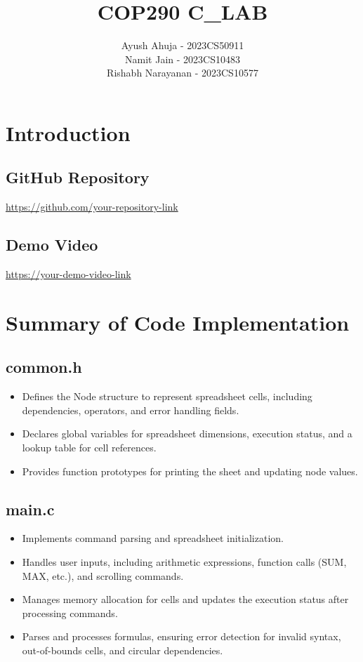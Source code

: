 \documentclass{article}
\title{\LARGE COP290 C_LAB}
\author{
    Ayush Ahuja - 2023CS50911\\
    Namit Jain - 2023CS10483\\
    Rishabh Narayanan - 2023CS10577
}
\date{}
\begin{document}
\maketitle

\section{Introduction}

\subsection{GitHub Repository}
\url{https://github.com/your-repository-link}

\subsection{Demo Video}
\url{https://your-demo-video-link}

\newpage

\section{Summary of Code Implementation}

\singlespacing %

\subsection{common.h}
\begin{itemize}
    \item Defines the Node structure to represent spreadsheet cells, including dependencies, operators, and error handling fields.
    \item Declares global variables for spreadsheet dimensions, execution status, and a lookup table for cell references.
    \item Provides function prototypes for printing the sheet and updating node values.
\end{itemize}

\subsection{main.c}
\begin{itemize}
    \item Implements command parsing and spreadsheet initialization.
    \item Handles user inputs, including arithmetic expressions, function calls (SUM, MAX, etc.), and scrolling commands.
    \item Manages memory allocation for cells and updates the execution status after processing commands.
    \item Parses and processes formulas, ensuring error detection for invalid syntax, out-of-bounds cells, and circular dependencies.
\end{itemize}
\end{document}
